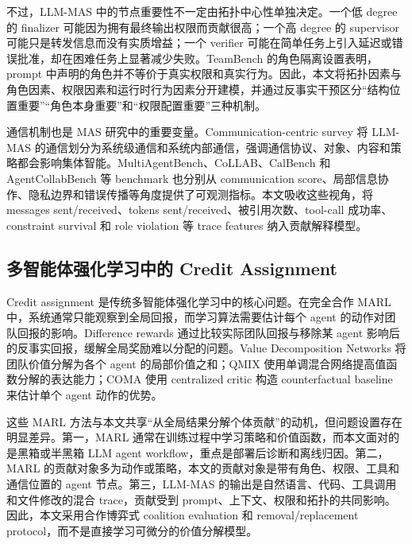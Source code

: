 不过，LLM-MAS 中的节点重要性不一定由拓扑中心性单独决定。一个低 degree 的 finalizer 可能因为拥有最终输出权限而贡献很高；一个高 degree 的 supervisor 可能只是转发信息而没有实质增益；一个 verifier 可能在简单任务上引入延迟或错误批准，却在困难任务上显著减少失败。TeamBench 的角色隔离设置表明，prompt 中声明的角色并不等价于真实权限和真实行为\cite{kim2026teambench}。因此，本文将拓扑因素与角色因素、权限因素和运行时行为因素分开建模，并通过反事实干预区分“结构位置重要”“角色本身重要”和“权限配置重要”三种机制。

通信机制也是 MAS 研究中的重要变量。Communication-centric survey 将 LLM-MAS 的通信划分为系统级通信和系统内部通信，强调通信协议、对象、内容和策略都会影响集体智能\cite{yan2025communication_survey}。MultiAgentBench、CoLLAB、CalBench 和 AgentCollabBench 等 benchmark 也分别从 communication score、局部信息协作、隐私边界和错误传播等角度提供了可观测指标\cite{zhu2025multiagentbench,mahmud2025collab,zou2026calbench,mazumder2026agentcollabbench}。本文吸收这些视角，将 messages sent/received、tokens sent/received、被引用次数、tool-call 成功率、constraint survival 和 role violation 等 trace features 纳入贡献解释模型。

\subsection{多智能体强化学习中的 Credit Assignment}

Credit assignment 是传统多智能体强化学习中的核心问题。在完全合作 MARL 中，系统通常只能观察到全局回报，而学习算法需要估计每个 agent 的动作对团队回报的影响。Difference rewards 通过比较实际团队回报与移除某 agent 影响后的反事实回报，缓解全局奖励难以分配的问题\cite{wolpert2001optimal}。Value Decomposition Networks 将团队价值分解为各个 agent 的局部价值之和\cite{sunehag2018value}；QMIX 使用单调混合网络提高值函数分解的表达能力\cite{rashid2018qmix}；COMA 使用 centralized critic 构造 counterfactual baseline 来估计单个 agent 动作的优势\cite{foerster2018coma}。

这些 MARL 方法与本文共享“从全局结果分解个体贡献”的动机，但问题设置存在明显差异。第一，MARL 通常在训练过程中学习策略和价值函数，而本文面对的是黑箱或半黑箱 LLM agent workflow，重点是部署后诊断和离线归因。第二，MARL 的贡献对象多为动作或策略，本文的贡献对象是带有角色、权限、工具和通信位置的 agent 节点。第三，LLM-MAS 的输出是自然语言、代码、工具调用和文件修改的混合 trace，贡献受到 prompt、上下文、权限和拓扑的共同影响。因此，本文采用合作博弈式 coalition evaluation 和 removal/replacement protocol，而不是直接学习可微分的价值分解模型。

